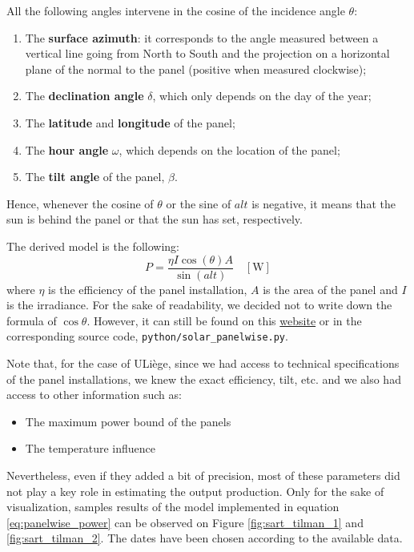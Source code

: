 \documentclass[a4paper, 12pt]{article}
\begin{document}
All the following angles intervene in the cosine of the incidence angle $\theta$:
\begin{enumerate}
    \item The \textbf{surface azimuth}: it corresponds to the angle measured between a vertical line going from North to South and the projection on a horizontal plane of the normal to the panel (positive when measured clockwise);
    \item The \textbf{declination angle} $\delta$, which only depends on the day of the year;
    \item The \textbf{latitude} and \textbf{longitude} of the panel;
    \item The \textbf{hour angle} $\omega$, which depends on the location of the panel;
    \item The \textbf{tilt angle} of the panel, $\beta$.
\end{enumerate}
Hence, whenever the cosine of $\theta$ or the sine of $alt$ is negative, it means that the sun is behind the panel or that the sun has set, respectively.

The derived model is the following:
\begin{equation}
    P = \frac{\eta I \cos(\theta) A}{\sin(alt)} \quad [\si{\watt}]
    \label{eq:panelwise_power}
\end{equation}
where $\eta$ is the efficiency of the panel installation, $A$ is the area of the panel and $I$ is the irradiance. For the sake of readability, we decided not to write down the formula of $\cos\theta$. However, it can still be found on this \href{https://www.itacanet.org/the-sun-as-a-source-of-energy/part-3-calculating-solar-angles/}{website} or in the corresponding source code, \texttt{python/solar\_panelwise.py}.

Note that, for the case of ULiège, since we had access to technical specifications of the panel installations, we knew the exact efficiency, tilt, etc. and we also had access to other information such as:
\begin{itemize}
    \item The maximum power bound of the panels
    \item The temperature influence
\end{itemize}
Nevertheless, even if they added a bit of precision, most of these parameters did not play a key role in estimating the output production. Only for the sake of visualization, samples results of the model implemented in equation \ref{eq:panelwise_power} can be observed on Figure \ref{fig:sart_tilman_1} and \ref{fig:sart_tilman_2}. The dates have been chosen according to the available data. 
\end{document}
